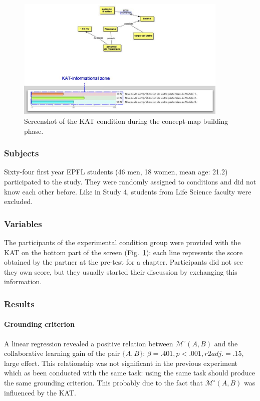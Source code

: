 \documentclass[natbib]{svjour3}
\newcommand{\gModel}[2]{{$\mathcal{M}^{\circ}(#1, #2)$}}
\begin{document}
\begin{figure}
        \centering
        \includegraphics[width=0.9\textwidth]{image11.png}
        \caption{Screenshot of the KAT condition during the concept-map building
        phase.}
        \label{study5:kat}
\end{figure}

\subsubsection*{Subjects}

Sixty-four first year EPFL students (46 men, 18 women, mean age: 21.2)
participated to the study. They were randomly assigned to conditions and
did not know each other before. Like in Study 4, students from Life Science
faculty were excluded.

\subsubsection*{Variables}

The participants of the experimental condition group were provided with the KAT
on the bottom part of the screen (Fig.~\ref{study5:kat}): each line represents
the score obtained by the partner at the pre-test for a chapter. Participants
did not see they own score, but they usually started their discussion by
exchanging this information.

\subsubsection*{Results}

\paragraph{Grounding criterion} A linear regression revealed a positive relation
between \gModel{A}{B} and the collaborative learning gain of the pair $\{A,
B\}$: $\beta= .401, p < .001, r2adj. =.15$, large effect. This relationship was
not significant in the previous experiment which as been conducted with the same
task: using the same task should produce the same grounding criterion. This
probably due to the fact that \gModel{A}{B} was influenced by the KAT.
\end{document}
